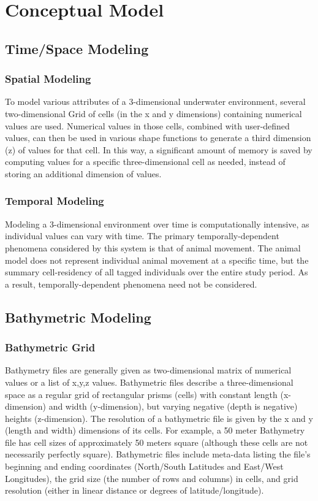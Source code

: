 \section{Conceptual Model}
\label{conceptualModel}
\subsection{Time/Space Modeling}
\label{timeSpaceModel}
\subsubsection{Spatial Modeling}
\label{spatialModeling}
To model various attributes of a 3-dimensional underwater environment, several two-dimensional Grid of cells (in the x and y dimensions) containing numerical values are used.  Numerical values in those cells, combined with user-defined values, can then be used in various shape functions to generate a third dimension (z) of values for that cell.  In this way, a significant amount of memory is saved by computing values for a specific three-dimensional cell as needed, instead of storing an additional dimension of values.  

\subsubsection{Temporal Modeling}
\label{temporalModeling}
Modeling a 3-dimensional environment over time is computationally intensive, as individual values can vary with time.  The primary temporally-dependent phenomena considered by this system is that of animal movement.  The animal model does not represent individual animal movement at a specific time, but the summary cell-residency of all tagged individuals over the entire study period.  As a result, temporally-dependent phenomena need not be considered. 




\subsection{Bathymetric Modeling}
\label{bathymetyricModeling}
\subsubsection{Bathymetric Grid}
\label{bathymetricGrid}
Bathymetry files are generally given as two-dimensional matrix of numerical values or a list of x,y,z values.  Bathymetric files describe a three-dimensional space as a regular grid of rectangular prisms (cells) with constant length (x-dimension) and width (y-dimension), but varying negative (depth is negative)  heights (z-dimension).  The resolution of a bathymetric file is given by the x and y (length and width) dimensions of its cells.  For example, a 50 meter Bathymetry file has cell sizes of approximately 50 meters square (although these cells are not necessarily perfectly square).  Bathymetric files include meta-data listing the file's beginning and ending coordinates (North/South Latitudes and East/West Longitudes), the grid size (the number of rows and columns) in cells, and grid resolution (either in linear distance or degrees of latitude/longitude).

